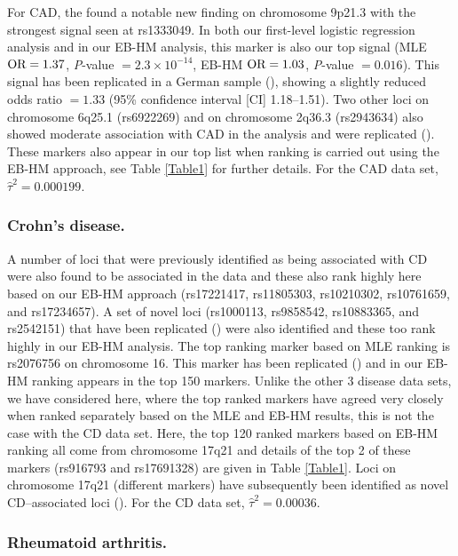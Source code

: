 \documentclass[oupdraft]{bio}
\begin{document}
For CAD, the
\citet{allison2006}
found a notable new finding on chromosome 9p21.3 with the
strongest signal seen at rs1333049. In both our first-level
logistic regression analysis and in our EB-HM analysis,
this marker is also our top signal (MLE $\hbox{OR} = 1.37$,
\textit{P}-value $= 2.3 \times 10^{-14}$,
EB-HM $\hbox{OR} = 1.03$, \textit{P}-value $= 0.016$).
This signal has been replicated in a German sample
(\citealp{Duditetal02}),
showing a slightly reduced odds ratio $= 1.33$
(95\% confidence interval [CI] 1.18--1.51). Two other
loci on chromosome 6q25.1 (rs6922269) and on chromosome
2q36.3 (rs2943634) also showed moderate association with
CAD in the
\citet{rma2003}
analysis and were replicated
(\citealp{LW2004}).
These markers also appear in our top list when ranking
is carried out using the EB-HM approach, see
Table \ref{Table1} for further details. For the CAD data
set, $\hat{\tau}^2 = 0.000199$.


\subsubsection{Crohn's disease.}

A number of loci that were previously identified as being
associated with CD were also found to be associated in the
\citet{tomlins2005}
data and these also rank highly here based on our EB-HM
approach (rs17221417, rs11805303, rs10210302, rs10761659,
and rs17234657). A set of novel loci (rs1000113, rs9858542,
rs10883365, and rs2542151) that have been replicated
(\citealp{TTC01})
were also identified and these too rank highly in our
EB-HM analysis. The top ranking marker based on MLE
ranking is rs2076756 on chromosome 16. This marker has
been replicated
(\citealp{Gichangi_Vach:2006})
and in our EB-HM ranking appears in the top 150 markers.
Unlike the other 3 disease data sets, we have considered
here, where the top ranked markers have agreed very
closely when ranked separately based on the MLE and EB-HM
results, this is not the case with the CD data set. Here,
the top 120 ranked markers based on EB-HM ranking all come
from chromosome 17q21 and details of the top 2 of these
markers (rs916793 and rs17691328) are given in
Table \ref{Table1}. Loci on chromosome 17q21 (different
markers) have subsequently been identified as novel
CD--associated loci
(\citealp{Barlow_Bartholomew:1972}).
For the CD data set, $\hat{\tau}^2 = 0.00036$.


\subsubsection{Rheumatoid arthritis.}
\end{document}
